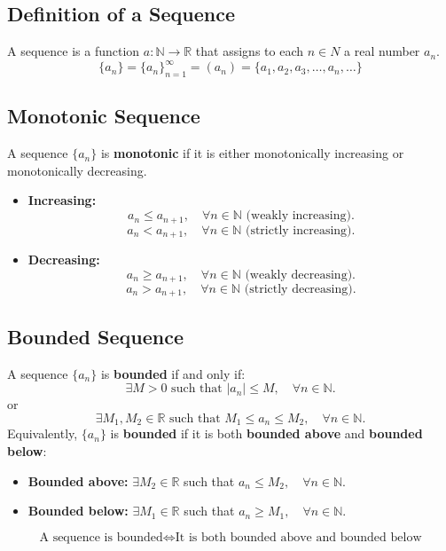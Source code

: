 \documentclass[a4paper,11pt]{article}
\theoremstyle{definition}
\theoremstyle{plain}
\theoremstyle{remark}
\begin{document}


\subsection{Definition of a Sequence}

\begin{tcolorbox}
    A sequence is a function $a: \mathbb{N} \rightarrow \mathbb{R}$ that assigns to each $n \in N$ a real number $a_n$.
    \[
    \{a_n\} = \{a_n\}_{n=1}^{\infty} = (a_n) = \{a_1, a_2, a_3, \dots, a_n, \dots\}
    \]
\end{tcolorbox}




\subsection{Monotonic Sequence}

\begin{tcolorbox}
    A sequence $\{a_n\}$ is \textbf{monotonic} if it is either monotonically increasing or monotonically decreasing.
    \begin{itemize}
        \item \textbf{Increasing:}
        \[ a_n \leq a_{n+1}, \quad \forall n \in \mathbb{N} \text{ (weakly increasing)}. \]
        \[ a_n < a_{n+1}, \quad \forall n \in \mathbb{N} \text{ (strictly increasing)}. \]
        \item \textbf{Decreasing:}
        \[ a_n \geq a_{n+1}, \quad \forall n \in \mathbb{N} \text{ (weakly decreasing)}. \]
        \[ a_n > a_{n+1}, \quad \forall n \in \mathbb{N} \text{ (strictly decreasing)}. \]
    \end{itemize}
\end{tcolorbox}




\subsection{Bounded Sequence}

\begin{tcolorbox}
    A sequence $\{a_n\}$ is \textbf{bounded} if and only if:
    \[
    \exists M > 0 \text{ such that } |a_n| \leq M, \quad \forall n \in \mathbb{N}.
    \]
    or
    \[ 
    \exists M_1, M_2 \in \mathbb{R} \text{ such that } M_1 \leq a_n \leq M_2, \quad \forall n \in \mathbb{N}.
    \]
    Equivalently, $\{a_n\}$ is \textbf{bounded} if it is both \textbf{bounded above} and \textbf{bounded below}:
    \begin{itemize}
        \item \textbf{Bounded above:} $\exists M_2 \in \mathbb{R}$ such that $a_n \leq M_2, \quad \forall n \in \mathbb{N}$.
        \item \textbf{Bounded below:} $\exists M_1 \in \mathbb{R}$ such that $a_n \geq M_1, \quad \forall n \in \mathbb{N}$.
    \end{itemize}
    \[
    \text{A sequence is bounded} \iff \text{It is both bounded above and bounded below}
    \]
\end{tcolorbox}
\end{document}
